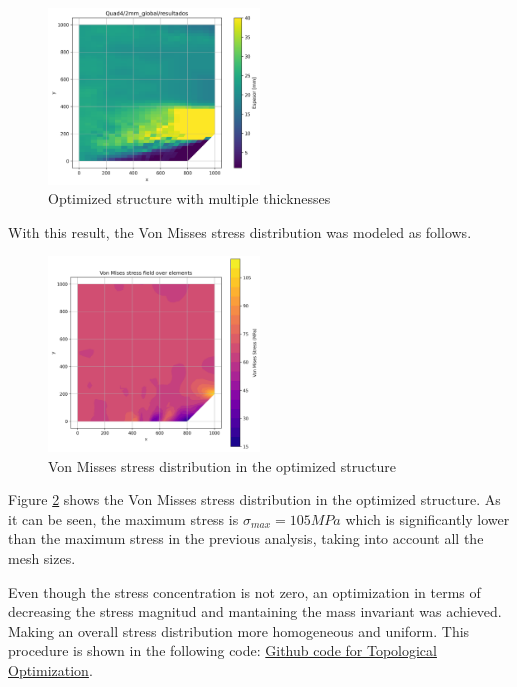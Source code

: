 \begin{figure}[H]
    \centering
    \includegraphics[width=0.5\textwidth]{GRAFICOS/Quad4/2mm_global/resultados_espesor_post_topologic.png}
    \caption{Optimized structure with multiple thicknesses}
    \label{fig:optimized_structure}
\end{figure}

With this result, the Von Misses stress distribution was modeled as follows.

\begin{figure}[H]
    \centering
    \includegraphics[width=0.5\textwidth]{GRAFICOS/Quad4/2mm_global/resultados_topo_von_mises_post_topologic.png}
    \caption{Von Misses stress distribution in the optimized structure}
    \label{fig:optimized_structure_stress}
\end{figure}

Figure \ref{fig:optimized_structure_stress} shows the Von Misses stress distribution in the optimized structure. As it can be seen, the maximum stress is $\sigma_{max} = 105 MPa$ which is significantly lower than the maximum stress in the previous analysis, taking into account all the mesh sizes.

Even though the stress concentration is not zero, an optimization in terms of decreasing the stress magnitud and mantaining the mass invariant was achieved. Making an overall stress distribution more homogeneous and uniform. This procedure is shown in the following code: \href{ https://github.com/LukasWolff2002/TAREA_3_FINITE/blob/main/ENTREGA_2/QUAD4/main.py}{Github code for Topological Optimization}.

